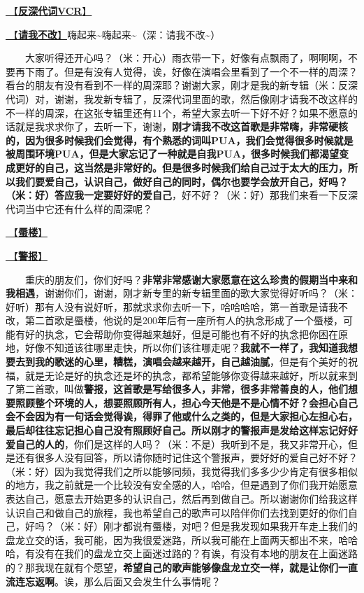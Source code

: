 \documentclass[]{ctexbook}
\begin{document}
\hyperref[senself-vcr]{🎥【\textbf{反深代词VCR}】}

\hyperref[brave-heart]{🎵【\textbf{请我不改}】}嗨起来\textasciitilde 嗨起来\textasciitilde（深：请我不改\textasciitilde）

  大家听得还开心吗？（米：开心）雨衣带一下，好像有点飘雨了，啊啊啊，不要再下雨了。但是有没有人觉得，诶，好像在演唱会里看到了一个不一样的周深？看台的朋友有没有看到不一样的周深耶？谢谢大家，刚才是我的新专辑（米：反深代词）对，谢谢，我发新专辑了，反深代词里面的歌，然后像刚才请我不改这样的不一样的周深，在这张专辑里还有11个，希望大家去听一下好不好？如果不愿意的话就是我求求你了，去听一下，谢谢，\textbf{刚才请我不改这首歌是非常嗨，非常硬核的，因为很多时候我们会觉得，有个熟悉的词叫PUA，我们会觉得很多时候就是被周围环境PUA，但是大家忘记了一种就是自我PUA，很多时候我们都渴望变成更好的自己，这当然是非常好的。但是很多时候我们给自己过于太大的压力，所以我们要爱自己，认识自己，做好自己的同时，偶尔也要学会放开自己，好吗？（米：好）答应我一定要好好的爱自己}，好不好？（米：好）那我们来看一下反深代词当中它还有什么样的周深呢？

\hyperref[mirage]{🎵【\textbf{蜃楼}】}

\hyperref[the-giver]{🎵【\textbf{警报}】}

  重庆的朋友们，你们好吗？\textbf{非常非常感谢大家愿意在这么珍贵的假期当中来和我相遇}，谢谢你们，谢谢，刚才新专里的新专辑里面的歌大家觉得好听吗？（米：好听）那有人没有说好听，那就求求你去听一下，哈哈哈哈，第一首歌是请我不改，第二首歌是蜃楼，他说的是200年后有一座所有人的执念形成了一个蜃楼，可能有好的执念，它会帮助你变得越来越好，但是可能也有不好的执念把你困在原地，好像不知道该往哪里走快，所以你们该往哪走呢？\textbf{我就不一样了，我知道我想要去到我的歌迷的心里，糟糕，演唱会越来越开，自己越油腻}，但是有个美好的祝福，就是无论是好的执念还是坏的执念，都希望能够你变得越来越好，所以就来到了第二首歌，叫做\textbf{警报，这首歌是写给很多人，非常，很多非常善良的人，他们想要照顾整个环境的人，想要照顾所有人，担心今天他是不是心情不好？会担心自己会不会因为有一句话会觉得诶，得罪了他或什么之类的，但是大家担心左担心右，最后却往往忘记担心自己没有照顾好自己。所以刚才的警报声是发给这样忘记好好爱自己的人的}，你们是这样的人吗？（米：不是）我听到不是，我又非常开心，但是还有很多人没有回答，所以请你随时记住这个警报声，要好好的爱自己好不好？（米：好）因为我觉得我们之所以能够同频，我觉得我们多多少少肯定有很多相似的地方，我之前就是一个比较没有安全感的人，哈哈，但是遇到了你们我开始愿意表达自己，愿意去开始更多的认识自己，然后再到做自己。所以谢谢你们给我这样认识自己和做自己的旅程，我也希望自己的歌声可以陪伴你们去找到更好的你们自己，好吗？（米：好）刚才都说有蜃楼，对吧？但是我发现如果我开车走上我们的盘龙立交的话，我可能，因为我很爱迷路，所以我可能在上面两天都出不来，哈哈哈，有没有在我们的盘龙立交上面迷过路的？有诶，有没有本地的朋友在上面迷路的？那我现在就有个愿望，\textbf{希望自己的歌声能够像盘龙立交一样，就是让你们一直流连忘返啊}。诶，那么后面又会发生什么事情呢？
\end{document}
